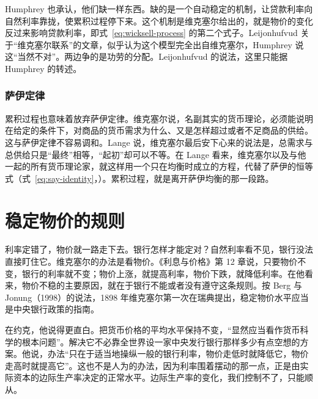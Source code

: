 Humphrey 也承认，他们缺一样东西。缺的是一个自动稳定的机制，让贷款利率向自然利率靠拢，使累积过程停下来\cite{humphrey1986}。这个机制是维克塞尔给出的，就是物价的变化反过来影响贷款利率，即式~\eqref{eq:wicksell-process} 的第二个式子\cite{humphrey1986}。Leijonhufvud 关于“维克塞尔联系”的文章，似乎认为这个模型完全出自维克塞尔，Humphrey 说这“当然不对”\cite{humphrey1986}。两边争的是功劳的分配。Leijonhufvud 的说法，这里只能据 Humphrey 的转述。

\subsubsection{萨伊定律}
累积过程也意味着放弃萨伊定律。维克塞尔说，名副其实的货币理论，必须能说明在给定的条件下，对商品的货币需求为什么、又是怎样超过或者不足商品的供给\cite{lange1942}。这与萨伊定律不容易调和。Lange 说，维克塞尔最后安下心来的说法是，总需求与总供给只是“最终”相等，“起初”却可以不等\cite{lange1942}。在 Lange 看来，维克塞尔以及与他一起的所有货币理论家，就这样用一个只在均衡时成立的方程，代替了萨伊的恒等式（式~\eqref{eq:say-identity}，）\cite{lange1942}。累积过程，就是离开萨伊均衡的那一段路。

\section{稳定物价的规则}\label{sec:wicksell-rule}

利率定错了，物价就一路走下去。银行怎样才能定对？自然利率看不见，银行没法直接盯住它。维克塞尔的办法是看物价。《利息与价格》第 12 章说，只要物价不变，银行的利率就不变；物价上涨，就提高利率，物价下跌，就降低利率\cite{wicksell1936}。在他看来，物价不稳的主要原因，就在于银行不能或者没有遵守这条规则\cite{wicksell1936}。按 Berg 与 Jonung（1998）的说法，1898 年维克塞尔第一次在瑞典提出，稳定物价水平应当是中央银行政策的指南\cite{berg1998}。

在约克，他说得更直白。把货币价格的平均水平保持不变，“显然应当看作货币科学的根本问题”\cite{wicksell1907}。解决它不必靠全世界设一家中央发行银行那样多少有点空想的方案\cite{wicksell1907}。他说，办法“只在于适当地操纵一般的银行利率，物价走低时就降低它，物价走高时就提高它”\cite{wicksell1907}。这也不是人为的办法，因为利率围着摆动的那一点，正是由实际资本的边际生产率决定的正常水平。边际生产率的变化，我们控制不了，只能顺从\cite{wicksell1907}。

